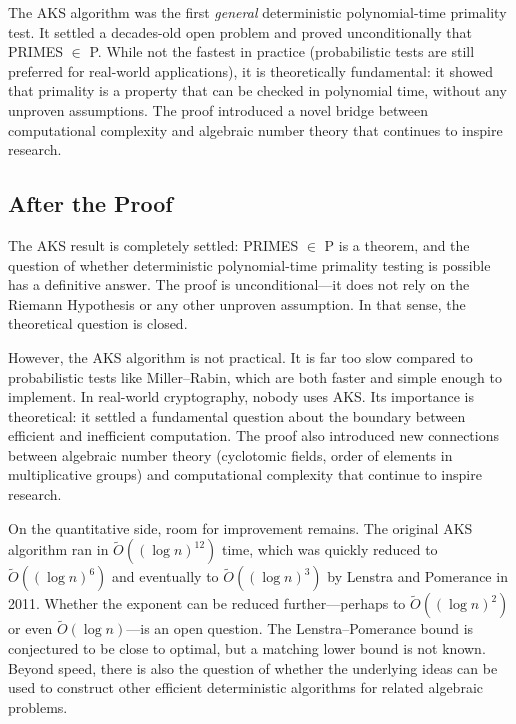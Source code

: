 \begin{highlightbox}
The AKS algorithm was the first \emph{general} deterministic polynomial-time primality test. It settled a decades-old open problem and proved unconditionally that PRIMES $\in$ P. While not the fastest in practice (probabilistic tests are still preferred for real-world applications), it is theoretically fundamental: it showed that primality is a property that can be checked in polynomial time, without any unproven assumptions. The proof introduced a novel bridge between computational complexity and algebraic number theory that continues to inspire research.
\end{highlightbox}

\subsection{After the Proof}

The AKS result is completely settled: PRIMES $\in$ P is a theorem, and the question of whether deterministic polynomial-time primality testing is possible has a definitive answer. The proof is unconditional---it does not rely on the Riemann Hypothesis or any other unproven assumption. In that sense, the theoretical question is closed.

However, the AKS algorithm is not practical. It is far too slow compared to probabilistic tests like Miller--Rabin, which are both faster and simple enough to implement. In real-world cryptography, nobody uses AKS. Its importance is theoretical: it settled a fundamental question about the boundary between efficient and inefficient computation. The proof also introduced new connections between algebraic number theory (cyclotomic fields, order of elements in multiplicative groups) and computational complexity that continue to inspire research.

On the quantitative side, room for improvement remains. The original AKS algorithm ran in $\tilde{O}((\log n)^{12})$ time, which was quickly reduced to $\tilde{O}((\log n)^6)$ and eventually to $\tilde{O}((\log n)^3)$ by Lenstra and Pomerance in 2011. Whether the exponent can be reduced further---perhaps to $\tilde{O}((\log n)^2)$ or even $\tilde{O}(\log n)$---is an open question. The Lenstra--Pomerance bound is conjectured to be close to optimal, but a matching lower bound is not known. Beyond speed, there is also the question of whether the underlying ideas can be used to construct other efficient deterministic algorithms for related algebraic problems.

